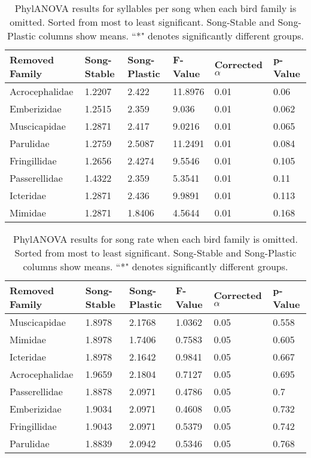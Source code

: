 \documentclass[a4paper,12pt]{article}
\begin{document}
\begin{table}[ht]
\caption{PhylANOVA results for syllables per song when each bird family is omitted.  Sorted from most to least significant.  Song-Stable and Song-Plastic columns show means.  ``*" denotes significantly different groups.}
\centering
\begin{tabular}{llllll}
  \hline
Removed Family & Song-Stable & Song-Plastic & F-Value & Corrected $\alpha$ & p-Value \\ 
  \hline
Acrocephalidae & 1.2207 & 2.422 & 11.8976 & 0.01 & 0.06 \\ 
  Emberizidae & 1.2515 & 2.359 & 9.036 & 0.01 & 0.062 \\ 
  Muscicapidae & 1.2871 & 2.417 & 9.0216 & 0.01 & 0.065 \\ 
  Parulidae & 1.2759 & 2.5087 & 11.2491 & 0.01 & 0.084 \\ 
  Fringillidae & 1.2656 & 2.4274 & 9.5546 & 0.01 & 0.105 \\ 
  Passerellidae & 1.4322 & 2.359 & 5.3541 & 0.01 & 0.11 \\ 
  Icteridae & 1.2871 & 2.436 & 9.9891 & 0.01 & 0.113 \\ 
  Mimidae & 1.2871 & 1.8406 & 4.5644 & 0.01 & 0.168 \\ 
   \hline
\end{tabular}
\end{table}

\begin{table}[ht]
\caption{PhylANOVA results for song rate when each bird family is omitted.  Sorted from most to least significant.  Song-Stable and Song-Plastic columns show means.  ``*" denotes significantly different groups.}
\centering
\begin{tabular}{llllll}
  \hline
Removed Family & Song-Stable & Song-Plastic & F-Value & Corrected $\alpha$ & p-Value \\ 
  \hline
Muscicapidae & 1.8978 & 2.1768 & 1.0362 & 0.05 & 0.558 \\ 
  Mimidae & 1.8978 & 1.7406 & 0.7583 & 0.05 & 0.605 \\ 
  Icteridae & 1.8978 & 2.1642 & 0.9841 & 0.05 & 0.667 \\ 
  Acrocephalidae & 1.9659 & 2.1804 & 0.7127 & 0.05 & 0.695 \\ 
  Passerellidae & 1.8878 & 2.0971 & 0.4786 & 0.05 & 0.7 \\ 
  Emberizidae & 1.9034 & 2.0971 & 0.4608 & 0.05 & 0.732 \\ 
  Fringillidae & 1.9043 & 2.0971 & 0.5379 & 0.05 & 0.742 \\ 
  Parulidae & 1.8839 & 2.0942 & 0.5346 & 0.05 & 0.768 \\ 
   \hline
\end{tabular}
\end{table}
\end{document}
